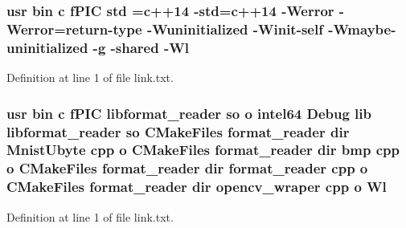 \subsubsection[{\texorpdfstring{std}{std}}]{\setlength{\rightskip}{0pt plus 5cm}usr bin {\bf c} f\+P\+IC std ={\bf c}++14 -\/std={\bf c}++14 -\/Werror -\/Werror=return-\/type -\/Wuninitialized -\/Winit-\/self -\/Wmaybe-\/uninitialized -\/g -\/shared -\/{\bf Wl}}\hypertarget{thirdparty_2common_2format__reader_2CMakeFiles_2format__reader_8dir_2link_8txt_a5f87c8f8e33670f7c8c5221b6be1bcc4}{}\label{thirdparty_2common_2format__reader_2CMakeFiles_2format__reader_8dir_2link_8txt_a5f87c8f8e33670f7c8c5221b6be1bcc4}


Definition at line 1 of file link.\+txt.

\subsubsection[{\texorpdfstring{Wl}{Wl}}]{\setlength{\rightskip}{0pt plus 5cm}usr bin {\bf c} f\+P\+IC libformat\+\_\+reader {\bf so} o intel64 Debug lib libformat\+\_\+reader {\bf so} C\+Make\+Files format\+\_\+reader dir Mnist\+Ubyte cpp o C\+Make\+Files format\+\_\+reader dir bmp cpp o C\+Make\+Files format\+\_\+reader dir format\+\_\+reader cpp o C\+Make\+Files format\+\_\+reader dir opencv\+\_\+wraper cpp o Wl}\hypertarget{thirdparty_2common_2format__reader_2CMakeFiles_2format__reader_8dir_2link_8txt_a9ad53fca0052428aab5ca4eb56074e08}{}\label{thirdparty_2common_2format__reader_2CMakeFiles_2format__reader_8dir_2link_8txt_a9ad53fca0052428aab5ca4eb56074e08}


Definition at line 1 of file link.\+txt.

